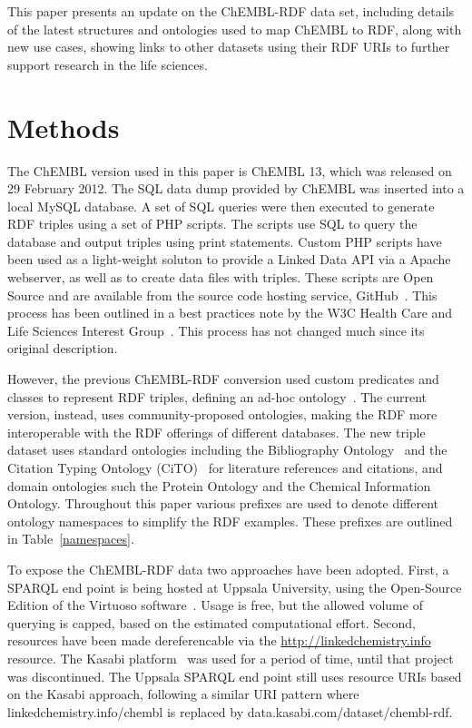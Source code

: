 \documentclass[10pt]{bmc_article}
\newenvironment{bmcformat}{\begin{raggedright}\baselineskip20pt\sloppy\setboolean{publ}{false}}{\end{raggedright}\baselineskip20pt\sloppy}
\begin{document}
\begin{bmcformat}
This paper presents an update on the ChEMBL-RDF data set, including details of the latest structures
and ontologies used to map ChEMBL to RDF, along with new use cases, showing 
links to other datasets using their RDF URIs to further support research in the life sciences.

\section*{Methods}
\label{s2}

The ChEMBL version used in this paper is ChEMBL 13, which was released on 29 February 2012.
The SQL data dump provided by ChEMBL was inserted into a local MySQL database. A set of SQL queries 
were then executed to generate RDF triples using a set of PHP scripts. The scripts use SQL to
query the database and output triples using print statements. Custom PHP scripts have been used
as a light-weight soluton to provide a Linked Data API via a Apache webserver, as well as to
create data files with triples. These scripts are Open Source 
and are available from the source code hosting service, GitHub~\cite{ChEMBLRDFGitHub}. This process 
has been outlined in a best practices note by the W3C Health Care and Life Sciences Interest
Group~\cite{Marshall2012}. This process has not changed much since its original description.

However, the previous ChEMBL-RDF conversion used custom predicates and classes to represent RDF triples, defining
an ad-hoc ontology~\cite{Willighagen2011}. The current version, instead, uses community-proposed
ontologies, making the RDF more interoperable with the RDF offerings of different databases. 
The new triple dataset uses standard ontologies
including the Bibliography Ontology~\cite{Giasson2011} and the Citation Typing Ontology (CiTO)~\cite{Shotton2010} for literature
references and citations, and domain ontologies such the Protein Ontology\cite{Sidhu2006} and the Chemical Information
Ontology\cite{Hastings2011}. Throughout this paper various prefixes are used to denote different ontology 
namespaces to simplify the RDF examples. These prefixes are outlined in Table~\ref{namespaces}.

To expose the ChEMBL-RDF data two approaches have been adopted. First, a SPARQL end point is being
hosted at Uppsala University, using the Open-Source Edition of the Virtuoso software~\cite{Virtuoso}. Usage is free, but the
allowed volume of querying is capped, based on the estimated computational effort. Second, resources have
been made dereferencable via the \url{http://linkedchemistry.info} resource. The Kasabi
platform~\cite{kasabi} was used for a period of time, until that project was discontinued.
The Uppsala SPARQL end point still uses resource URIs based on the Kasabi approach, following a similar
URI pattern where linkedchemistry.info/chembl is replaced by data.kasabi.com/dataset/chembl-rdf.


\end{bmcformat}
\end{document}
